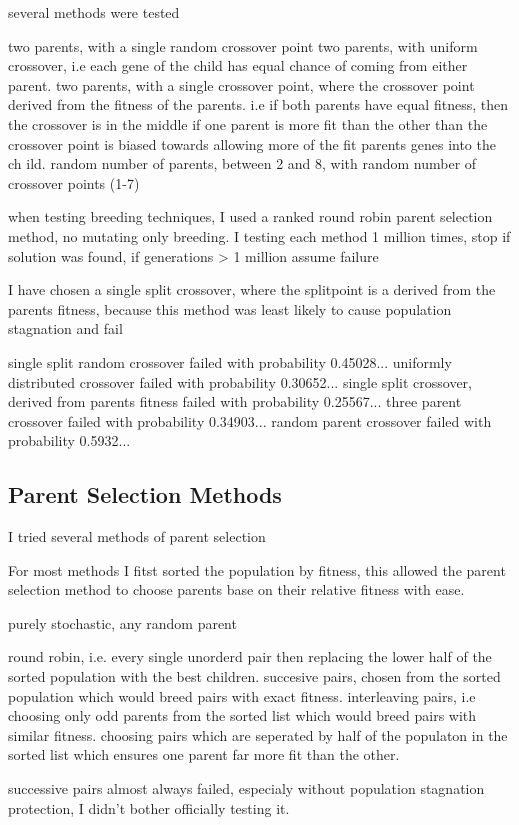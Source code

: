 \documentclass[a4paper,11pt]{article}
\begin{document}
several methods were tested

two parents, with a single random crossover point
two parents, with uniform crossover,
i.e each gene of the child has equal chance of coming from either parent.
two parents, with a single crossover point, where the crossover point derived from the fitness of the parents.
i.e if both parents have equal fitness, then the crossover is in the middle
if one parent is more fit than the other than the crossover point is biased towards allowing more of the fit parents genes into the ch
ild.
random number of parents, between 2 and 8, with random number of crossover points (1-7)

when testing breeding techniques, I used a ranked round robin parent selection method, no mutating only breeding.
I testing each method 1 million times, stop if solution was found, if generations > 1 million assume failure 


I have chosen a single split crossover, where the splitpoint is a derived from the parents fitness, because this method was least likely to cause population stagnation and fail

single split random crossover
failed with probability 0.45028...
uniformly distributed crossover
failed with probability 0.30652... 
single split crossover, derived from parents fitness
failed with probability 0.25567...
three parent crossover
failed with probability 0.34903...
random parent crossover
failed with probability 0.5932...
\subsection*{Parent Selection Methods}
I tried several methods of parent selection

For most methods I fitst sorted the population by fitness, this allowed the parent selection method to choose parents base on their relative fitness with ease.

purely stochastic, any random parent

round robin, i.e. every single unorderd pair
then replacing the lower half of the sorted population with the best children.  
succesive pairs, chosen from the sorted population
which would breed pairs with exact fitness.
interleaving pairs, i.e choosing only odd parents from the sorted list
which would breed pairs with similar fitness.
choosing pairs which are seperated by half of the populaton in the sorted list
which ensures one parent far more fit than the other.

successive pairs almost always failed, especialy without population stagnation protection, I didn't bother officially testing it.
\end{document}
